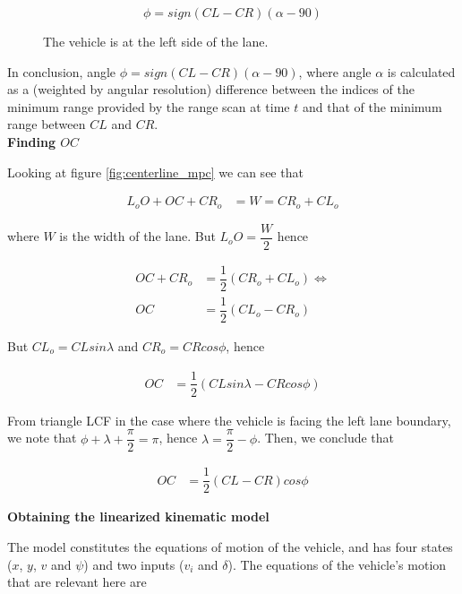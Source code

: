 $$\phi = sign(CL-CR)(\alpha - 90)$$

\begin{figure}[H]\centering
  \scalebox{1}{}
  \caption{The vehicle is at the left side of the lane.}
  \label{fig:circular_mpc_rotation_car_at_left_side}
\end{figure}


In conclusion, angle $\phi = sign(CL-CR) (\alpha-90)$, where angle $\alpha$
is calculated as a (weighted by angular resolution) difference between the
indices of the minimum range provided by the range scan at time $t$ and that
of the minimum range between $CL$ and $CR$. \\


\textbf{Finding $OC$}

Looking at figure \ref{fig:centerline_mpc} we can see that

\begin{align}
  L_o O + OC + CR_o &= W = CR_o + CL_o
\end{align}

where $W$ is the width of the lane. But $L_o O = \dfrac{W}{2}$ hence

\begin{align}
  OC + CR_o &= \dfrac{1}{2}(CR_o + CL_o) \Leftrightarrow \\
  OC &= \dfrac{1}{2}(CL_o - CR_o)
\end{align}

But $CL_o = CL sin\lambda$ and $CR_o = CR cos\phi$, hence


\begin{align}
  OC &= \dfrac{1}{2}(CL sin\lambda - CR cos\phi)
\end{align}

From triangle LCF in the case where the vehicle is facing the left lane boundary,
we note that $\phi + \lambda + \dfrac{\pi}{2} = \pi$,
hence $\lambda = \dfrac{\pi}{2} - \phi$. Then, we conclude that

\begin{align}
  OC &= \dfrac{1}{2}(CL - CR) cos\phi
\end{align}




\textbf{Obtaining the linearized kinematic model}

The model constitutes the equations of motion of the vehicle, and has four
states ($x$, $y$, $v$ and $\psi$) and two inputs ($v_i$ and $\delta$). The
equations of the vehicle's motion that are relevant here are

